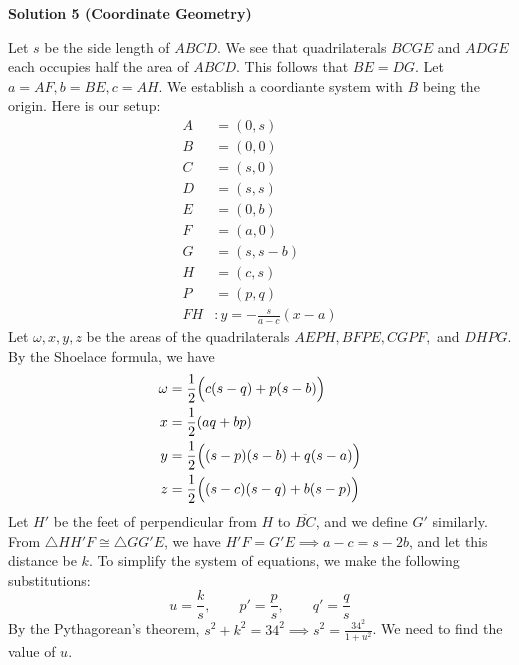 \begin{enumerate}
\textbf{Solution 5 (Coordinate Geometry)}

Let $s$ be the side length of $ABCD$. We see that quadrilaterals $BCGE$ and $ADGE$ each occupies half the area of $ABCD$. This follows that $BE=DG$. Let $a=AF,b=BE,c=AH$. We establish a coordiante system with $B$ being the origin. Here is our setup:\begin{align*}A&=(0,s)\\B&=(0,0)\\C&=(s,0)\\D&=(s,s)\\E&=(0,b)\\F&=(a,0)\\G&=(s,s-b)\\H&=(c,s)\\P&=(p,q)\\FH&:y=-\frac{s}{a-c}(x-a)\end{align*}
Let $\omega,x,y,z$ be the areas of the quadrilaterals $AEPH, BFPE, CGPF,$ and $DHPG$. By the Shoelace formula, we have\begin{align*}\omega&=\frac{1}{2}\Bigl(c(s-q)+p(s-b)\Bigr)\\x&=\frac{1}{2}(aq+bp)\\y&=\frac{1}{2}\Bigl((s-p)(s-b)+q(s-a)\Bigr)\\z&=\frac{1}{2}\Bigl((s-c)(s-q)+b(s-p)\Bigr)\end{align*}
Let $H'$ be the feet of perpendicular from $H$ to $\overline{BC}$, and we define $G'$ similarly. From $\triangle HH'F \cong \triangle GG'E$, we have $H'F=G'E\implies a-c=s-2b$, and let this distance be $k$. To simplify the system of equations, we make the following substitutions:
 \[u=\frac{k}{s},\qquad p'=\frac{p}{s},\qquad q'=\frac{q}{s}\]By the Pythagorean's theorem, $s^2+k^2=34^2\implies s^2=\frac{34^2}{1+u^2}$. We need to find the value of $u$.


\end{enumerate}

